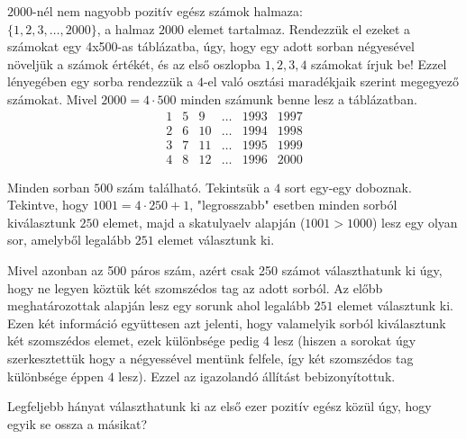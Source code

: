 \begin{solution}
	$2000$-nél nem nagyobb pozitív egész számok halmaza: \\
	$\{1,2,3,\ldots,2000\}$, a halmaz $2000$ elemet tartalmaz. Rendezzük
	el ezeket a számokat egy 4x500-as táblázatba, úgy, hogy egy adott
	sorban négyesével növeljük a számok értékét, és az első oszlopba $1,2,3,4$
	számokat írjuk be! Ezzel lényegében egy sorba rendezzük a $4$-el
	való osztási maradékjaik szerint megegyező számokat. Mivel $2000=4\cdot500$
	minden számunk benne lesz a táblázatban. 
	\[
	\begin{array}{cccccc}
		1 & 5 & 9 & \ldots & 1993 & 1997\\
		2 & 6 & 10 & \ldots & 1994 & 1998\\
		3 & 7 & 11 & \ldots & 1995 & 1999\\
		4 & 8 & 12 & \ldots & 1996 & 2000
	\end{array}
	\]
	
	Minden sorban $500$ szám található. Tekintsük a $4$ sort egy-egy
	doboznak. Tekintve, hogy $1001=4\cdot250+1$, "legrosszabb" esetben
	minden sorból kiválasztunk $250$ elemet, majd a skatulyaelv alapján
	($1001>1000$) lesz egy olyan sor, amelyből legalább $251$ elemet
	választunk ki.
	
	Mivel azonban az 500 páros szám, azért csak 250 számot választhatunk
	ki úgy, hogy ne legyen köztük két szomszédos tag az adott sorból.
	Az előbb meghatározottak alapján lesz egy sorunk ahol legalább $251$
	elemet választunk ki. Ezen két információ együttesen azt jelenti,
	hogy valamelyik sorból kiválasztunk két szomszédos elemet, ezek különbsége
	pedig 4 lesz (hiszen a sorokat úgy szerkesztettük hogy a négyessével
	mentünk felfele, így két szomszédos tag különbsége éppen $4$ lesz).
	Ezzel az igazolandó állítást bebizonyítottuk.
\end{solution}
\begin{extraproblem}
	Legfeljebb hányat választhatunk ki az első ezer pozitív egész közül
	úgy, hogy egyik se ossza a másikat? 
\end{extraproblem}


